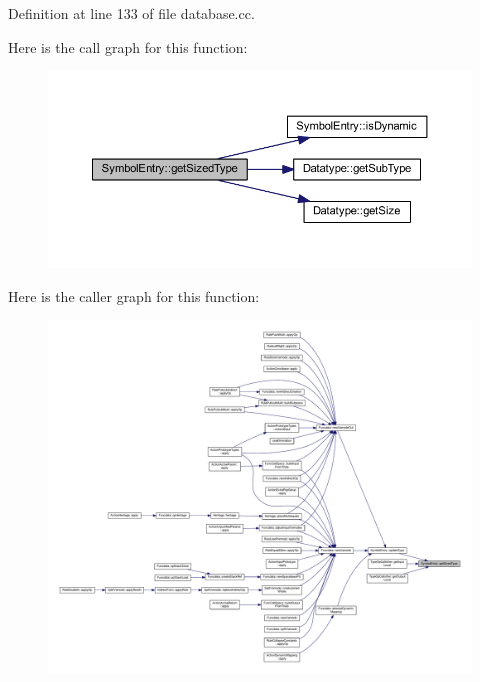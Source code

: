 Definition at line 133 of file database.\+cc.

Here is the call graph for this function\+:
\nopagebreak
\begin{figure}[H]
\begin{center}
\leavevmode
\includegraphics[width=350pt]{class_symbol_entry_a84cb58373a0e587c0698396a65f3a9b9_cgraph}
\end{center}
\end{figure}
Here is the caller graph for this function\+:
\nopagebreak
\begin{figure}[H]
\begin{center}
\leavevmode
\includegraphics[width=350pt]{class_symbol_entry_a84cb58373a0e587c0698396a65f3a9b9_icgraph}
\end{center}
\end{figure}
\mbox{\label{class_symbol_entry_afb88a4dae96af6bb42c0bd0434d7e756}} 
